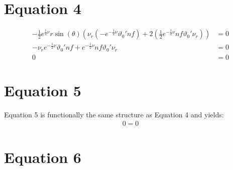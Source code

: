 \documentclass[12pt]{article}
\begin{document}
\section*{Equation 4}

\begin{align}
-\frac{1}{2} e^{\frac{1}{2} \nu} r \sin(\theta) 
\left(
    \nu_r \left( 
        - e^{-\frac{1}{2} \nu} \vartheta_0' nf
    \right)
    + 2 \left(
        \frac{1}{2} e^{-\frac{1}{2} \nu} nf \vartheta_0' \nu_r
    \right)
\right) &= 0 \nonumber \\ 
    - \nu_r e^{-\frac{1}{2} \nu} \vartheta_0' nf
    + e^{-\frac{1}{2} \nu} nf \vartheta_0' \nu_r &= 0 \nonumber \\
0 &= 0
\end{align}

\section*{Equation 5}

Equation 5 is functionally the same structure as Equation 4 and yields:
\begin{align}
  0 = 0
\end{align}

\section*{Equation 6}
\end{document}

